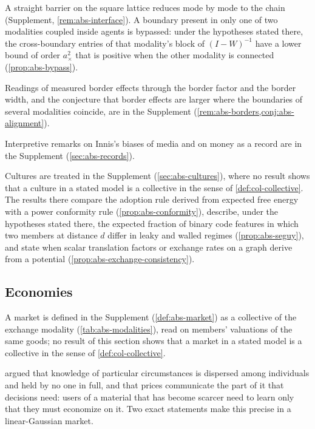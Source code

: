 A straight barrier on the square lattice reduces mode by mode to the chain (Supplement, \cref{rem:abs-interface}). A boundary present in only one of two modalities coupled inside agents is bypassed: under the hypotheses stated there, the cross-boundary entries of that modality's block of $(I-W)^{-1}$ have a lower bound of order $a_\times^2$ that is positive when the other modality is connected (\cref{prop:abs-bypass}).

Readings of measured border effects through the border factor and the border width, and the conjecture that border effects are larger where the boundaries of several modalities coincide, are in the Supplement (\cref{rem:abs-borders,conj:abs-alignment}).

Interpretive remarks on Innis's biases of media and on money as a record are in the Supplement (\cref{sec:abs-records}).

Cultures are treated in the Supplement (\cref{sec:abs-cultures}), where no result shows that a culture in a stated model is a collective in the sense of \cref{def:col-collective}. The results there compare the adoption rule derived from expected free energy with a power conformity rule (\cref{prop:abs-conformity}), describe, under the hypotheses stated there, the expected fraction of binary code features in which two members at distance $d$ differ in leaky and walled regimes (\cref{prop:abs-seguy}), and state when scalar translation factors or exchange rates on a graph derive from a potential (\cref{prop:abs-exchange-consistency}).

\subsection{Economies}\label{sec:abs-economies}

A market is defined in the Supplement (\cref{def:abs-market}) as a collective of the exchange modality (\cref{tab:abs-modalities}), read on members' valuations of the same goods; no result of this section shows that a market in a stated model is a collective in the sense of \cref{def:col-collective}.

\citet{hayek1945use} argued that knowledge of particular circumstances is dispersed among individuals and held by no one in full, and that prices communicate the part of it that decisions need: users of a material that has become scarcer need to learn only that they must economize on it. Two exact statements make this precise in a linear-Gaussian market.

